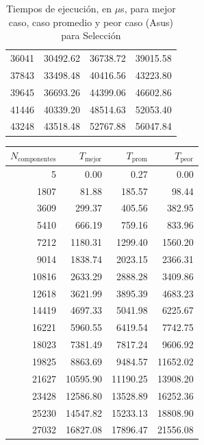 \documentclass{homework}
\begin{document}
\begin{table}[H]
\begin{tabular}{|r|r|r|r|}
                36041 & 30492.62 & 36738.72 & 39015.58 \\ 
                37843 & 33498.48 & 40416.56 & 43223.80 \\ 
                39645 & 36693.26 & 44399.06 & 46602.86 \\ 
                41446 & 40339.20 & 48514.63 & 52053.40 \\ 
                43248 & 43518.48 & 52767.88 & 56047.84 \\ 
                \hline
        \end{tabular}
        \caption{Tiempos de ejecución, en $\mu$s, para mejor caso, caso promedio y peor caso (Asus) para Selección}
    \end{table}

    \begin{table}[H]  
        \footnotesize
        \centering 
        \begin{tabular}{|r|r|r|r|} 
                \hline
                $N_{\text{componentes}}$ & $T_{\text{mejor}}$ & $T_{\text{prom}}$ & $T_{\text{peor}}$ \\
                \hline 
                5 & 0.00 & 0.27 & 0.00 \\ 
                1807 & 81.88 & 185.57 & 98.44 \\ 
                3609 & 299.37 & 405.56 & 382.95 \\ 
                5410 & 666.19 & 759.16 & 833.96 \\ 
                7212 & 1180.31 & 1299.40 & 1560.20 \\ 
                9014 & 1838.74 & 2023.15 & 2366.31 \\ 
                10816 & 2633.29 & 2888.28 & 3409.86 \\ 
                12618 & 3621.99 & 3895.39 & 4683.23 \\ 
                14419 & 4697.33 & 5041.98 & 6225.67 \\ 
                16221 & 5960.55 & 6419.54 & 7742.75 \\ 
                18023 & 7381.49 & 7817.24 & 9606.92 \\ 
                19825 & 8863.69 & 9484.57 & 11652.02 \\ 
                21627 & 10595.90 & 11190.25 & 13908.20 \\ 
                23428 & 12586.80 & 13528.89 & 16252.36 \\ 
                25230 & 14547.82 & 15233.13 & 18808.90 \\ 
                27032 & 16827.08 & 17896.47 & 21556.08 \\ 

\end{tabular}
\end{table}
\end{document}
